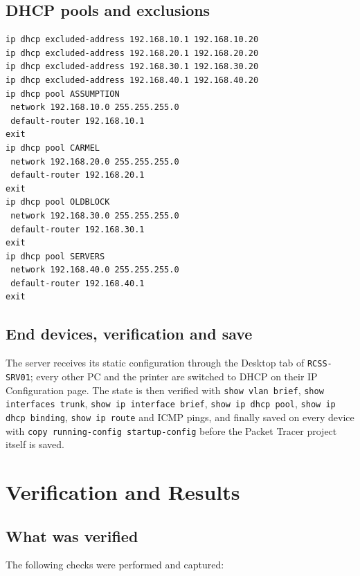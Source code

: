 \documentclass[11pt,a4paper]{article}
\begin{document}
\subsection{DHCP pools and exclusions}

\begin{lstlisting}[caption={DHCP configuration on \texttt{RCSS-R1}}]
ip dhcp excluded-address 192.168.10.1 192.168.10.20
ip dhcp excluded-address 192.168.20.1 192.168.20.20
ip dhcp excluded-address 192.168.30.1 192.168.30.20
ip dhcp excluded-address 192.168.40.1 192.168.40.20
ip dhcp pool ASSUMPTION
 network 192.168.10.0 255.255.255.0
 default-router 192.168.10.1
exit
ip dhcp pool CARMEL
 network 192.168.20.0 255.255.255.0
 default-router 192.168.20.1
exit
ip dhcp pool OLDBLOCK
 network 192.168.30.0 255.255.255.0
 default-router 192.168.30.1
exit
ip dhcp pool SERVERS
 network 192.168.40.0 255.255.255.0
 default-router 192.168.40.1
exit
\end{lstlisting}

\subsection{End devices, verification and save}

\noindent
The server receives its static configuration through the Desktop tab of
\texttt{RCSS-SRV01}; every other PC and the printer are switched to DHCP on their IP
Configuration page. The state is then verified with \texttt{show vlan brief},
\texttt{show interfaces trunk}, \texttt{show ip interface brief},
\texttt{show ip dhcp pool}, \texttt{show ip dhcp binding}, \texttt{show ip route} and
ICMP pings, and finally saved on every device with
\texttt{copy running-config startup-config} before the Packet Tracer project itself is
saved.

\section{Verification and Results}
\label{sec:verify}

\subsection{What was verified}

\noindent
The following checks were performed and captured:
\end{document}
